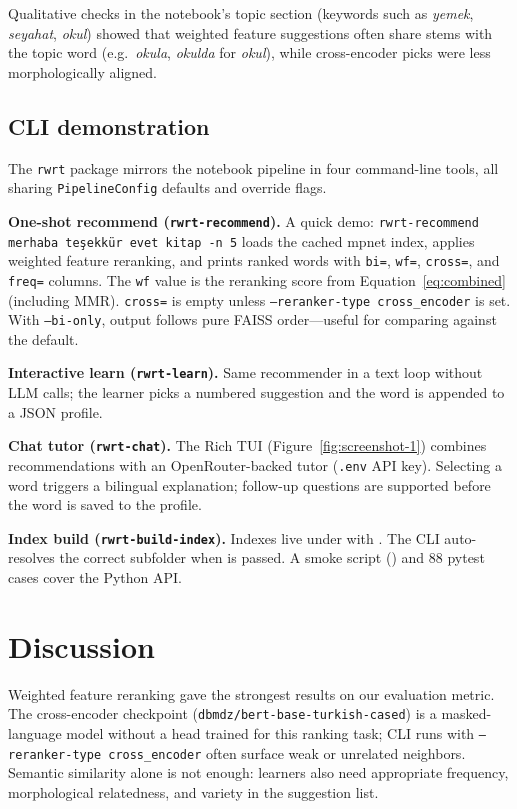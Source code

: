 \documentclass{article}
\begin{document}
Qualitative checks in the notebook's topic section (keywords such as \textit{yemek}, \textit{seyahat}, \textit{okul}) showed that weighted feature suggestions often share stems with the topic word (e.g.\ \textit{okula}, \textit{okulda} for \textit{okul}), while cross-encoder picks were less morphologically aligned.

\subsection{CLI demonstration}

The \texttt{rwrt} package mirrors the notebook pipeline in four command-line tools, all sharing \texttt{PipelineConfig} defaults and override flags.

\textbf{One-shot recommend (\texttt{rwrt-recommend}).}
A quick demo: \texttt{rwrt-recommend merhaba teşekkür evet kitap -n 5} loads the cached mpnet index, applies weighted feature reranking, and prints ranked words with \texttt{bi=}, \texttt{wf=}, \texttt{cross=}, and \texttt{freq=} columns. The \texttt{wf} value is the reranking score from Equation~\eqref{eq:combined} (including MMR). \texttt{cross=} is empty unless \texttt{--reranker-type cross\_encoder} is set. With \texttt{--bi-only}, output follows pure FAISS order---useful for comparing against the default.

\textbf{Interactive learn (\texttt{rwrt-learn}).}
Same recommender in a text loop without LLM calls; the learner picks a numbered suggestion and the word is appended to a JSON profile.

\textbf{Chat tutor (\texttt{rwrt-chat}).}
The Rich TUI (Figure~\ref{fig:screenshot-1}) combines recommendations with an OpenRouter-backed tutor (\texttt{.env} API key). Selecting a word triggers a bilingual explanation; follow-up questions are supported before the word is saved to the profile.

\textbf{Index build (\texttt{rwrt-build-index}).}
Indexes live under  with . The CLI auto-resolves the correct subfolder when  is passed. A smoke script () and 88 pytest cases cover the Python API.

\section{Discussion}

Weighted feature reranking gave the strongest results on our evaluation metric. The cross-encoder checkpoint (\texttt{dbmdz/bert-base-turkish-cased}) is a masked-language model without a head trained for this ranking task; CLI runs with \texttt{--reranker-type cross\_encoder} often surface weak or unrelated neighbors. Semantic similarity alone is not enough: learners also need appropriate frequency, morphological relatedness, and variety in the suggestion list.
\end{document}
